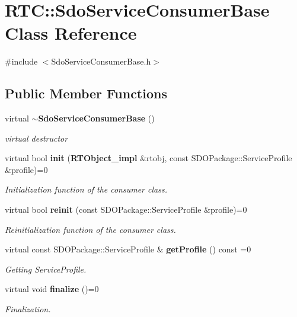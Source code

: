 \section{RTC::SdoServiceConsumerBase Class Reference}
\label{classRTC_1_1SdoServiceConsumerBase}


{\ttfamily \#include $<$SdoServiceConsumerBase.h$>$}

\subsection*{Public Member Functions}
\begin{DoxyCompactItemize}
\item 
virtual {\bf $\sim$SdoServiceConsumerBase} ()
\begin{DoxyCompactList}\small\item\em virtual destructor \item\end{DoxyCompactList}\item 
virtual bool {\bf init} ({\bf RTObject\_\-impl} \&rtobj, const SDOPackage::ServiceProfile \&profile)=0
\begin{DoxyCompactList}\small\item\em Initialization function of the consumer class. \item\end{DoxyCompactList}\item 
virtual bool {\bf reinit} (const SDOPackage::ServiceProfile \&profile)=0
\begin{DoxyCompactList}\small\item\em Reinitialization function of the consumer class. \item\end{DoxyCompactList}\item 
virtual const SDOPackage::ServiceProfile \& {\bf getProfile} () const =0
\begin{DoxyCompactList}\small\item\em Getting ServiceProfile. \item\end{DoxyCompactList}\item 
virtual void {\bf finalize} ()=0
\begin{DoxyCompactList}\small\item\em Finalization. \item\end{DoxyCompactList}\end{DoxyCompactItemize}


